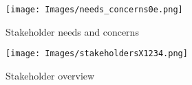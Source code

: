 \documentclass{article}
\begin{document}
\begin{figure}[H]
    \centering
  \texttt{[image: Images/needs\_concerns0e.png]}
  \caption{Stakeholder needs and concerns}
  \label{fig:s_needs}
\end{figure}

\begin{figure}[H]
    \centering
  \texttt{[image: Images/stakeholdersX1234.png]}
  \caption{Stakeholder overview}
  \label{stakeholder}
\end{figure}
\end{document}
